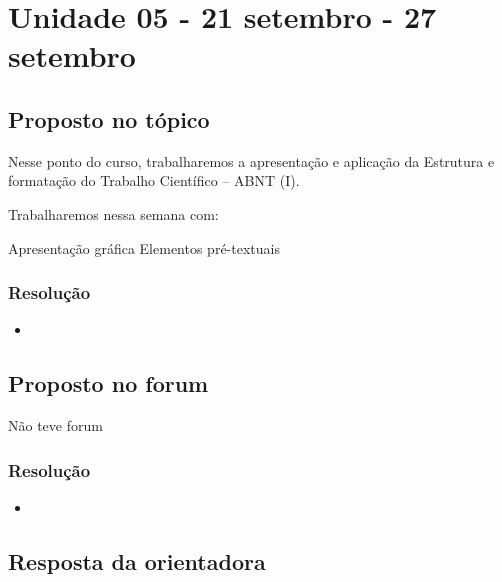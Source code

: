 

\chapter{Unidade 05 - 21 setembro - 27 setembro}

\section{Proposto no tópico}

Nesse ponto do curso, trabalharemos a apresentação e aplicação da Estrutura e formatação do Trabalho Científico – ABNT (I).

Trabalharemos nessa semana com:

    Apresentação gráfica
    Elementos pré-textuais

\subsection{Resolução}


\begin{itemize}
  \item 
\end{itemize}

\section{Proposto no forum}

Não teve forum


\subsection{Resolução}

\begin{itemize}
	\item 
\end{itemize}

\section{Resposta da orientadora}

